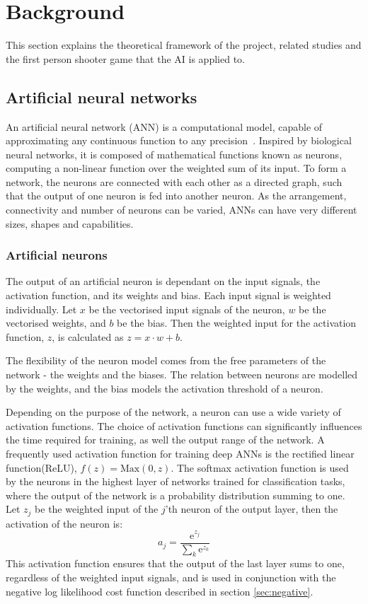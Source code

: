 \newpage
\section{Background}
\label{sec:background}
This section explains the theoretical framework of the project, related studies and the first person shooter game that the AI is applied to.

\subsection{Artificial neural networks}
An artificial neural network (ANN) is a computational model, capable of approximating any continuous function to any precision~\cite{kurt}. Inspired by biological neural networks, it is composed of mathematical functions known as neurons, computing a non-linear function over the weighted sum of its input. To form a network, the neurons are connected with each other as a directed graph, such that the output of one neuron is fed into another neuron. As the arrangement, connectivity and number of neurons can be varied, ANNs can have very different sizes, shapes and capabilities.

\subsubsection{Artificial neurons}
The output of an artificial neuron is dependant on the input signals, the activation function, and its weights and bias. Each input signal is weighted individually. Let $x$ be the vectorised input signals of the neuron, $w$ be the vectorised weights, and $b$ be the bias. Then the weighted input for the activation function, $z$, is calculated as $z = x \cdot w + b$.

The flexibility of the neuron model comes from the free parameters of the network - the weights and the biases. The relation between neurons are modelled by the weights, and the bias models the activation threshold of a neuron.

Depending on the purpose of the network, a neuron can use a wide variety of activation functions. The choice of activation functions can significantly influences the time required for training, as well the output range of the network. A frequently used activation function for training deep ANNs is the rectified linear function(ReLU), $f(z) = \text{Max}(0,z)$. The softmax activation function is used by the neurons in the highest layer of networks trained for classification tasks, where the output of the network is a probability distribution summing to one. Let $z_j$ be the weighted input of the $j$'th neuron of the output layer, then the activation of the neuron is:
$$a_j = \frac{ \text{e}^{z_j} }{ \sum_{k} \text{e}^{z_k} }$$
This activation function ensures that the output of the last layer sums to one, regardless of the weighted input signals, and is used in conjunction with the negative log likelihood cost function described in section \ref{sec:negative}.

